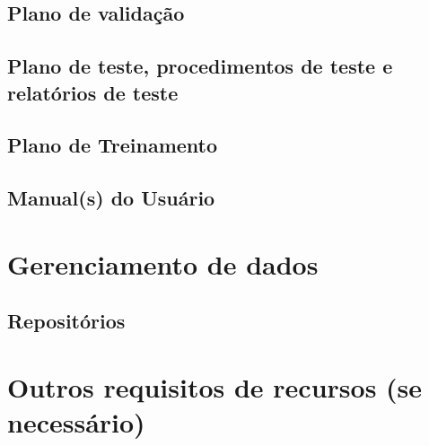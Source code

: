 \subsection{Plano de validação}

\subsection{Plano de teste, procedimentos de teste e relatórios de teste}

\subsection{Plano de Treinamento}

\subsection{Manual(s) do Usuário}

\section{Gerenciamento de dados}

\subsection{Repositórios}

\section{Outros requisitos de recursos (se necessário)}
